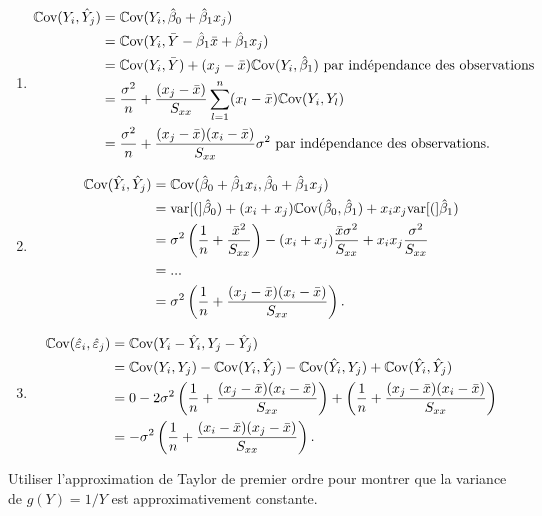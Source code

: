 \begin{solution}{2.20}
\begin{enumerate}
\item
\begin{align*}
\mathbb{C}\text{ov}(Y_i,\hat{Y}_j)&=\mathbb{C}\text{ov}(Y_i,\hat{\beta}_0+\hat{\beta}_1x_j)\\
&=\mathbb{C}\text{ov}(Y_i,\bar{Y}-\hat{\beta}_1\bar{x}+\hat{\beta}_1x_j)\\
&=\mathbb{C}\text{ov}(Y_i,\bar{Y})+(x_j-\bar{x})\mathbb{C}\text{ov}(Y_i,\hat{\beta}_1) \mbox{ par indépendance des observations}\\
&=\frac{\sigma^2}{n}+\frac{(x_j-\bar{x})}{S_{xx}}\sum_{l=1}^n(x_l-\bar{x})\mathbb{C}\text{ov}(Y_i,Y_l)\\
&=\frac{\sigma^2}{n}+\frac{(x_j-\bar{x})(x_i-\bar{x})}{S_{xx}}\sigma^2\mbox{ par indépendance des observations}.\\
\end{align*}

\item
\begin{align*}
\mathbb{C}\text{ov}(\hat{Y}_i,\hat{Y}_j)&=\mathbb{C}\text{ov}(\hat{\beta}_0+\hat{\beta}_1x_i,\hat{\beta}_0+\hat{\beta}_1x_j)\\
&=\mathrm{var} [ ( ]\hat{\beta}_0)+(x_i+x_j)\mathbb{C}\text{ov}(\hat{\beta}_0,\hat{\beta}_1)+x_ix_j\mathrm{var} [ ( ]\hat{\beta}_1)\\
&=\sigma^2\left(\frac{1}{n}+\frac{\bar{x}^2}{S_{xx}}\right)-(x_i+x_j)\frac{\bar{x}\sigma^2}{S_{xx}}+x_ix_j\frac{\sigma^2}{S_{xx}}\\
&=...\\
&=\sigma^2\left(\frac{1}{n}+\frac{(x_j-\bar{x})(x_i-\bar{x})}{S_{xx}}\right).
\end{align*}

\item
\begin{align*}
\mathbb{C}\text{ov}(\hat{\varepsilon}_i,\hat{\varepsilon}_j)&=\mathbb{C}\text{ov}(Y_i-\hat{Y}_i,Y_j-\hat{Y}_j)\\
&=\mathbb{C}\text{ov}(Y_i,Y_j)-\mathbb{C}\text{ov}(Y_i,\hat{Y}_j)-\mathbb{C}\text{ov}(\hat{Y}_i,Y_j)+\mathbb{C}\text{ov}(\hat{Y}_i,\hat{Y}_j)\\
&=0-2\sigma^2\left(\frac{1}{n}+\frac{(x_j-\bar{x})(x_i-\bar{x})}{S_{xx}}\right)+\left(\frac{1}{n}+\frac{(x_j-\bar{x})(x_i-\bar{x})}{S_{xx}}\right)\\
&=-\sigma^2\left(\frac{1}{n}+\frac{(x_i-\bar{x})(x_j-\bar{x})}{S_{xx}}\right).
\end{align*}
\end{enumerate}
\end{solution}
\begin{solution}{2.21}
Utiliser l'approximation de Taylor de premier ordre pour montrer que la variance de $g(Y)=1/Y$ est approximativement constante.
\end{solution}
